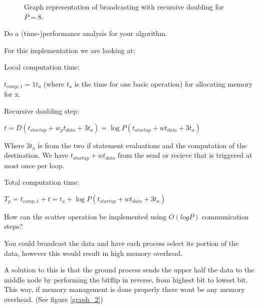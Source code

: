 \documentclass[a4paper]{exam}
\begin{document}
\begin{questions}
\begin{figure}[ht!]
\caption{Graph representation of broadcasting with recursive doubling for $P = 8$.}
\label{graph}
\end{figure}

\pagebreak


\addpoints \question Do a (time-)performance analysis for your algorithm.

\begin{solution}
  For this implementation we are looking at:

  Local computation time:

  $t_{comp,1} = 1t_a$ (where $t_a$ is the time for one basic operation) for allocating memory for x.

  Recursive doubling step:

  $t = D(t_{startup} + w_pt_{data} + 3t_a) = \log P(t_{startup} + wt_{data} + 3t_a)$

  Where $3t_a$ is from the two if statement evaluations and the computation of the destination. We have $t_{startup} + wt_{data}$ from the send or recieve that is triggered at most once per loop.

  Total computation time:

  $T_p = t_{comp,1} + t = t_a + \log P(t_{startup} + wt_{data} + 3t_a)$
\end{solution}

\addpoints \question How can the scatter operation be implemented using $O(log P)$ communication steps?

\begin{solution}
You could broadcast the data and have each process select its portion of the data, however this would result in high memory overhead.

A solution to this is that the ground process sends the upper half the data to the middle node by performing the bitflip in reverse, from highest bit to lowest bit. This way, if memory management is done properly there wont be any memory overhead. (See figure \ref{graph_2})
\end{solution}


\end{questions}
\end{document}
